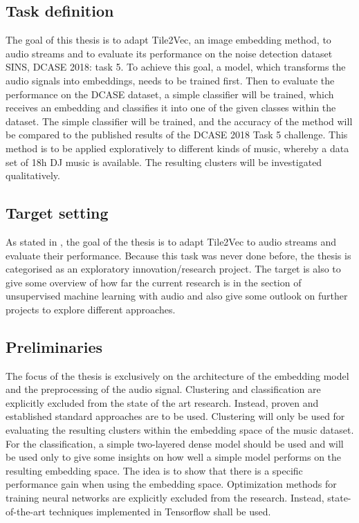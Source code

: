 \subsection{Task definition}
\label{sub:Task-Definition}
The goal of this thesis is to adapt Tile2Vec, an image embedding method, to audio streams and to evaluate its performance on the noise detection dataset \flqq SINS, DCASE 2018: task 5\frqq. 
\newline
\newline
To achieve this goal, a model, which transforms the audio signals into embeddings, needs to be trained first. Then to evaluate the performance on the DCASE dataset, a simple classifier will be trained, which receives an embedding and classifies it into one of the given classes within the dataset. The simple classifier will be trained, and the accuracy of the method will be compared to the published results of the DCASE 2018 Task 5 challenge.
\newline
\newline
This method is to be applied exploratively to different kinds of music, whereby a data set of 18h DJ music is available. The resulting clusters will be investigated qualitatively.

\subsection{Target setting}
\label{sub:Target-Setting}
As stated in , the goal of the thesis is to adapt Tile2Vec to audio streams and evaluate their performance. Because this task was never done before, the thesis is categorised as an exploratory innovation/research project. The target is also to give some overview of how far the current research is in the section of unsupervised machine learning with audio and also give some outlook on further projects to explore different approaches.

\subsection{Preliminaries}
\label{sub:Preliminaries}
The focus of the thesis is exclusively on the architecture of the embedding model and the preprocessing of the audio signal. Clustering and classification are explicitly excluded from the state of the art research. Instead, proven and established standard approaches are to be used.
\newline
\newline
Clustering will only be used for evaluating the resulting clusters within the embedding space of the music dataset. For the classification, a simple two-layered dense model should be used and will be used only to give some insights on how well a simple model performs on the resulting embedding space. The idea is to show that there is a specific performance gain when using the embedding space.
\newline
\newline
Optimization methods for training neural networks are explicitly excluded from the research. Instead, state-of-the-art techniques implemented in Tensorflow shall be used.
